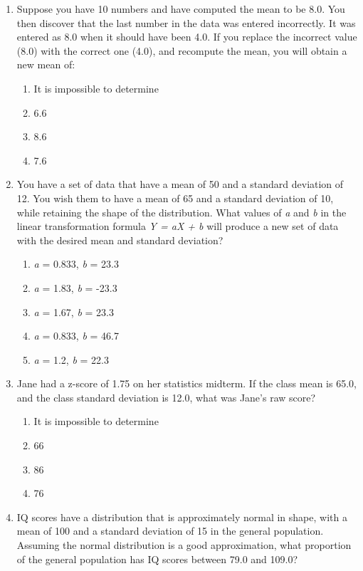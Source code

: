\documentclass[]{article}
\begin{document}
\begin{enumerate}
\def\labelenumi{\arabic{enumi}.}
\item
  Suppose you have 10 numbers and have computed the mean to be 8.0. You
  then discover that the last number in the data was entered
  incorrectly. It was entered as 8.0 when it should have been 4.0. If
  you replace the incorrect value (8.0) with the correct one (4.0), and
  recompute the mean, you will obtain a new mean of:

  \begin{enumerate}
  \def\labelenumii{\alph{enumii}.}
  \item
    It is impossible to determine
  \item
    6.6
  \item
    8.6
  \item
    7.6
  \end{enumerate}
\item
  You have a set of data that have a mean of 50 and a standard deviation
  of 12. You wish them to have a mean of 65 and a standard deviation of
  10, while retaining the shape of the distribution. What values of
  \emph{a} and \emph{b} in the linear transformation formula \emph{Y =
  aX + b} will produce a new set of data with the desired mean and
  standard deviation?

  \begin{enumerate}
  \def\labelenumii{\alph{enumii}.}
  \item
    \emph{a} = 0.833, \emph{b} = 23.3
  \item
    \emph{a} = 1.83, \emph{b} = -23.3
  \item
    \emph{a} = 1.67, \emph{b} = 23.3
  \item
    \emph{a} = 0.833, \emph{b} = 46.7
  \item
    \emph{a} = 1.2, \emph{b} = 22.3
  \end{enumerate}
\item
  Jane had a z-score of 1.75 on her statistics midterm. If the class
  mean is 65.0, and the class standard deviation is 12.0, what was
  Jane's raw score?

  \begin{enumerate}
  \def\labelenumii{\alph{enumii}.}
  \item
    It is impossible to determine
  \item
    66
  \item
    86
  \item
    76
  \end{enumerate}
\item
  IQ scores have a distribution that is approximately normal in shape,
  with a mean of 100 and a standard deviation of 15 in the general
  population. Assuming the normal distribution is a good approximation,
  what proportion of the general population has IQ scores between 79.0
  and 109.0?


\end{enumerate}
\end{document}
